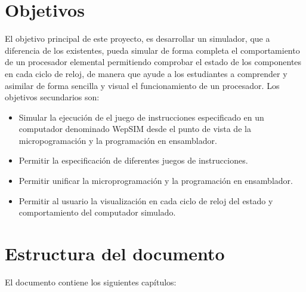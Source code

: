 \section{Objetivos}
\label{sec:objectives}

El objetivo principal de este proyecto, es desarrollar un simulador, que a diferencia de los existentes, pueda simular de forma completa el comportamiento de un procesador elemental permitiendo comprobar el estado de los componentes en cada ciclo de reloj, de manera que ayude a los estudiantes a comprender y asimilar de forma sencilla y visual el funcionamiento de un procesador. Los objetivos secundarios son:

\begin{itemize}

\item Simular la ejecución de el juego de instrucciones especificado en un computador denominado WepSIM desde el punto de vista de la micropogramación y la programación en ensamblador.

\item Permitir la especificación de diferentes juegos de instrucciones.

\item Permitir unificar la microprogramación y la programación en ensamblador.

\item Permitir al usuario la visualización en cada ciclo de reloj del estado y comportamiento del computador simulado.

\end{itemize}

\section{Estructura del documento}
\label{sec:document_structure}

El documento contiene los siguientes capítulos:


